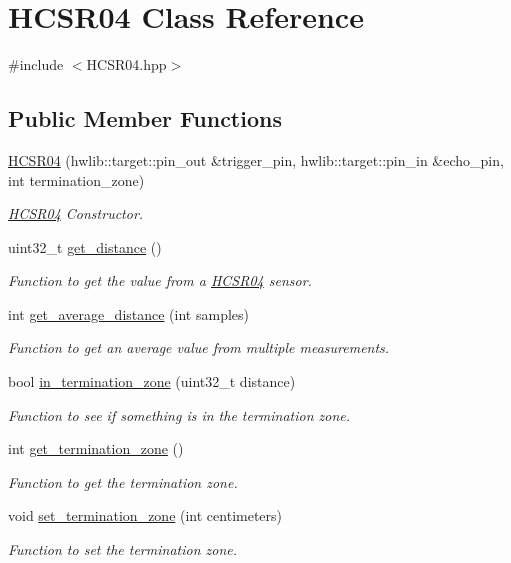 \hypertarget{class_h_c_s_r04}{}\section{H\+C\+S\+R04 Class Reference}
\label{class_h_c_s_r04}


{\ttfamily \#include $<$H\+C\+S\+R04.\+hpp$>$}

\subsection*{Public Member Functions}
\begin{DoxyCompactItemize}
\item 
\hyperlink{class_h_c_s_r04_ac75fefd776d1b35bfd6589ac40ff904e}{H\+C\+S\+R04} (hwlib\+::target\+::pin\+\_\+out \&trigger\+\_\+pin, hwlib\+::target\+::pin\+\_\+in \&echo\+\_\+pin, int termination\+\_\+zone)
\begin{DoxyCompactList}\small\item\em \hyperlink{class_h_c_s_r04}{H\+C\+S\+R04} Constructor. \end{DoxyCompactList}\item 
uint32\+\_\+t \hyperlink{class_h_c_s_r04_a6f0e9830e49a9f482211890ca87e98c4}{get\+\_\+distance} ()
\begin{DoxyCompactList}\small\item\em Function to get the value from a \hyperlink{class_h_c_s_r04}{H\+C\+S\+R04} sensor. \end{DoxyCompactList}\item 
int \hyperlink{class_h_c_s_r04_aec660395befa5be0a49315352dd8589f}{get\+\_\+average\+\_\+distance} (int samples)
\begin{DoxyCompactList}\small\item\em Function to get an average value from multiple measurements. \end{DoxyCompactList}\item 
bool \hyperlink{class_h_c_s_r04_a927ed3c322a83c02e4739ee2cc4b45a2}{in\+\_\+termination\+\_\+zone} (uint32\+\_\+t distance)
\begin{DoxyCompactList}\small\item\em Function to see if something is in the termination zone. \end{DoxyCompactList}\item 
int \hyperlink{class_h_c_s_r04_a0b796d03c8bfc551d5af8cb9b776c0f1}{get\+\_\+termination\+\_\+zone} ()
\begin{DoxyCompactList}\small\item\em Function to get the termination zone. \end{DoxyCompactList}\item 
void \hyperlink{class_h_c_s_r04_aebbf05553e7818475e4846422088806e}{set\+\_\+termination\+\_\+zone} (int centimeters)
\begin{DoxyCompactList}\small\item\em Function to set the termination zone. \end{DoxyCompactList}\end{DoxyCompactItemize}


